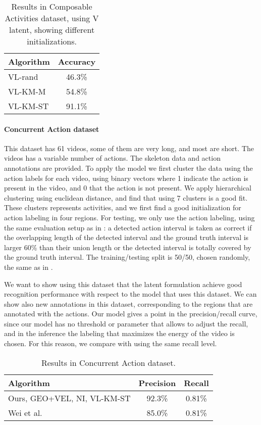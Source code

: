 \begin{table}
\centering
\begin{tabular}{|l|c|}
\hline
\textbf{Algorithm} & \textbf{Accuracy}\\
\hline
VL-rand   & 46.3\% \\
VL-KM-M   & 54.8\% \\
VL-KM-ST   & 91.1\% \\
\hline
\end{tabular}
\caption{Results in Composable Activities dataset, using V latent, showing different initializations. }
\end{table}

\paragraph{Concurrent Action dataset} This dataset has 61 videos, some of them are very long, and most are short. The videos has a variable number of actions. The skeleton data and action annotations are provided. To apply the model we first cluster the data using the action labels for each video, using binary vectors where 1 indicate the action is present in the video, and 0 that the action is not present. We apply hierarchical clustering using euclidean distance, and find that using 7 clusters is a good fit. These clusters represents activities, and we first find a good initialization for action labeling in four regions. For testing, we only use the action labeling, using the same evaluation setup as in \cite{Wei2013}: a detected action interval is taken as correct if the overlapping length of the detected interval and the ground truth interval is larger 60\% than their union length or the detected interval is totally covered by the ground truth interval. The training/testing split is 50/50, chosen randomly, the same as in \cite{Wei2013}.

We want to show using this dataset that the latent formulation achieve good recognition performance with respect to the model that uses this dataset. We can show also new annotations in this dataset, corresponding to the regions that are annotated with the actions. Our model gives a point in the precision/recall curve, since our model has no threshold or parameter that allows to adjust the recall, and in the  inference the labeling that maximizes the energy of the video is chosen. For this reason, we compare with \cite{Wei2013} using the same recall level.

\begin{table}
\centering
\begin{tabular}{|l|c|c|}
\hline
\textbf{Algorithm} & \textbf{Precision} & \textbf{Recall}\\
\hline
Ours, GEO+VEL, NI, VL-KM-ST &  92.3\% & 0.81\% \\
\hline
Wei et al. \cite{Wei2013} & 85.0\% & 0.81\% \\
\hline
\end{tabular}
\caption{Results in Concurrent Action dataset. }
\end{table}
  
